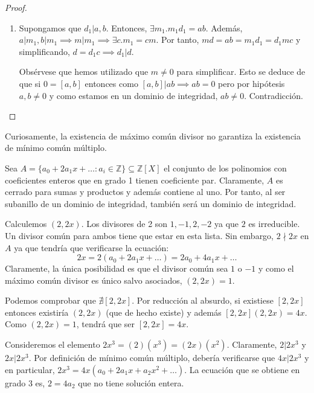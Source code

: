 \begin{proof}
\begin{enumerate}
\begin{enumerate}
\item Supongamos que $d_1|a,b$. Entonces, $\exists m_1. m_1d_1 = ab$. Además, $a|m_1,b|m_1 \implies m|m_1 \implies \exists c. m_1 = cm$. Por tanto, $md = ab = m_1d_1 = d_1mc$ y simplificando, $d = d_1c \implies d_1|d$. 

Obsérvese que hemos utilizado que $m \neq 0$ para simplificar. Esto se deduce de que si $0 = [a,b]$ entonces como $[a,b]|ab \implies ab = 0$ pero por hipótesis $a,b \neq 0$ y como estamos en un dominio de integridad, $ab \neq 0$. Contradicción.
\end{enumerate}
\end{enumerate}
\end{proof}

Curiosamente, la existencia de máximo común divisor no garantiza la existencia de mínimo común múltiplo. 

\begin{example}
Sea $A = \{a_0+2a_1x+\ldots:a_i \in \mathbb{Z} \} \subseteq \mathbb{Z}[X]$ el conjunto de los polinomios con coeficientes enteros que en grado 1 tienen coeficiente par. Claramente, $A$ es cerrado para sumas y productos y además contiene al uno. Por tanto, al ser subanillo de un dominio de integridad, también será un dominio de integridad. 

Calculemos $(2,2x)$. Los divisores de 2 son $1,-1,2,-2$ ya que $2$ es irreducible. Un divisor común para ambos tiene que estar en esta lista. Sin embargo, $2 \nmid 2x$ en $A$ ya que tendría que verificarse la ecuación: $$2x = 2(a_0+2a_1x+\ldots) = 2a_0+4a_1x+\ldots$$ Claramente, la única posibilidad es que el divisor común sea $1$ o $-1$ y como el máximo común divisor es único salvo asociados, $(2,2x) = 1$. 

Podemos comprobar que $\nexists [2,2x]$. Por reducción al absurdo, si existiese $[2,2x]$ entonces existiría $(2,2x)$ (que de hecho existe) y además $[2,2x](2,2x) = 4x$. Como $(2,2x) = 1$, tendrá que ser $[2,2x] = 4x$. 

Consideremos el elemento $2x^3 = (2)(x^3) = (2x)(x^2)$. Claramente, $2|2x^3$ y $2x|2x^3$. Por definición de mínimo común múltiplo, debería verificarse que $4x|2x^3$ y en particular, $2x^3 = 4x(a_0+2a_1x+a_2x^2+\ldots)$. La ecuación que se obtiene en grado 3 es, $2 = 4a_2$ que no tiene solución entera. 
\end{example}

